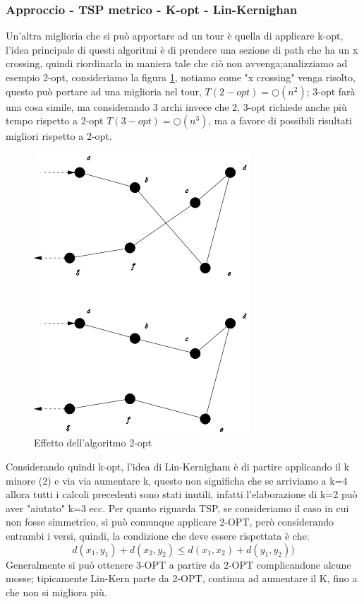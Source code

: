 \documentclass[12pt,a4paper]{article}
\begin{document}
\subsubsection{Approccio - TSP metrico - K-opt - Lin-Kernighan}
Un'altra miglioria che si può apportare ad un  tour è quella di applicare k-opt, l'idea principale di questi algoritmi è di prendere una sezione di path che ha un x crossing, quindi riordinarla in maniera tale che ciò non avvenga;analizziamo ad esempio 2-opt, consideriamo la figura \ref{fig:11}, notiamo come "x crossing" venga risolto, questo può portare ad una miglioria nel tour, $T(2-opt) = \bigcirc(n^2)$; 3-opt farà una cosa simile, ma considerando 3 archi invece che 2, 3-opt richiede anche più tempo rispetto a 2-opt $T(3-opt) = \bigcirc(n^3)$, ma a favore di possibili risultati migliori rispetto a 2-opt.
\begin{figure}[h]
	\centering
	\includegraphics[width=0.5\linewidth]{img/2-opt_wiki.svg.png}
	\caption{Effetto dell'algoritmo 2-opt}
	\label{fig:11}
\end{figure}
Considerando quindi k-opt, l'idea di Lin-Kernigham è di partire applicando il k minore (2) e via via aumentare k, questo non significha che se arriviamo a k=4 allora tutti i calcoli precedenti sono stati inutili, infatti l'elaborazione di k=2 può aver "aiutato" k=3 ecc. Per quanto riguarda TSP, se consideriamo il caso in cui non fosse simmetrico, si può comunque applicare 2-OPT, però considerando entrambi i versi, quindi, la condizione che deve essere rispettata è che:$$d(x_1, y_1) + d(x_2, y_2) \leq d(x_1, x_2) + d(y_1, y_2))$$
Generalmente si può ottenere 3-OPT a partire da 2-OPT complicandone alcune mosse; tipicamente Lin-Kern parte da 2-OPT, continua ad aumentare il K, fino a che non si migliora più.
\end{document}
